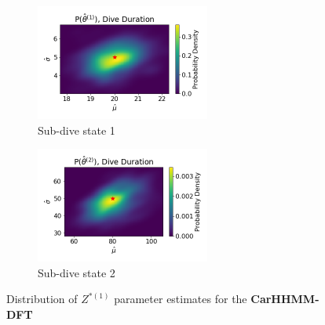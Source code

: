 \documentclass[12pt]{TD-CJS}
\begin{document}
\begin{figure}[ht]
	\centering
	\begin{subfigure}[t]{0.45\textwidth}
        \centering
        \includegraphics[width=2.25in]{../Plots/hhmm_FV_MLE_density_dive_duration_-1_0.png}
        \caption{Sub-dive state 1}
    \end{subfigure}
    \begin{subfigure}[t]{0.45\textwidth}
        \centering
        \includegraphics[width=2.25in]{../Plots/hhmm_FV_MLE_density_dive_duration_-1_1.png}
        \caption{Sub-dive state 2}
    \end{subfigure}
    \caption{Distribution of $Z^{*(1)}$ parameter estimates for the \textbf{CarHHMM-DFT}}
\end{figure}
\end{document}
